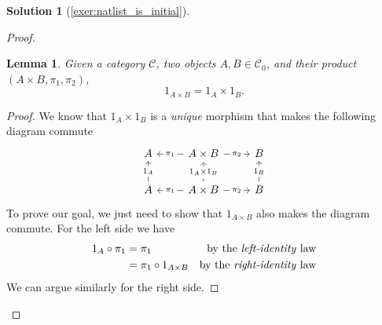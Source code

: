 \documentclass[a4paper,11pt, oneside,titlepage=false]{scrbook}
\theoremstyle{plain}
\newtheorem{lemma}[thm]{Lemma}
\theoremstyle{definition}
\newtheorem{solution}[thm]{Solution}
\newcommand{\Cat}[1]{\mathcal{#1}}
\newcommand{\CC}{\Cat{C}}
\begin{document}
\begin{solution}[\cref{exer:natlist_is_initial}]
\begin{proof}
			\begin{lemma}
				\label{lem:id-id}
				Given a category $\CC$, two objects $A, B \in \CC_0$, and their product $(A \times B, \pi_1, \pi_2)$,
        \[
					1_{A \times B} = 1_A \times 1_B.
				\]
			\end{lemma}
			\begin{proof}
				We know that $1_A \times 1_B$ is a \textit{unique} morphism that makes the following diagram commute
				\[
					\begin{tikzcd}
						A & {A \times B} & B \\
						A & {A \times B} & B
						\arrow["{\pi_1}"{description}, from=1-2, to=1-1]
						\arrow["{\pi_2}"{description}, from=1-2, to=1-3]
						\arrow["{1_A \times 1_B}"{description}, dashed, from=2-2, to=1-2]
						\arrow["{1_B}"{description}, from=2-3, to=1-3]
						\arrow["{1_A}"{description}, from=2-1, to=1-1]
						\arrow["{\pi_1}"{description}, from=2-2, to=2-1]
						\arrow["{\pi_2}"{description}, from=2-2, to=2-3]
					\end{tikzcd}
				\]
				To prove our goal, we just need to show that $1_{A \times B}$ also makes the diagram commute.
				For the left side we have
				\begin{align*}
					1_A \circ \pi_1 & = \pi_1                      & \text{by the \textit{left-identity} law}  \\
					                & = \pi_1 \circ 1_{A \times B} & \text{by the \textit{right-identity} law}
				\end{align*}
				We can argue similarly for the right side.
			\end{proof}


\end{proof}
\end{solution}
\end{document}
